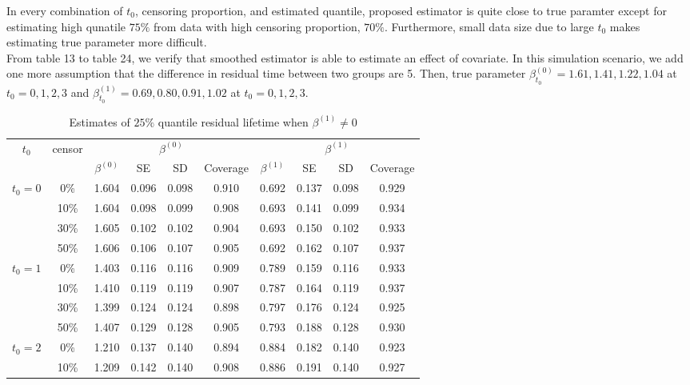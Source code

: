 \documentclass[12pt]{article}
\begin{document}
	In every combination of $t_0$, censoring proportion, and estimated quantile, proposed estimator is quite close to true paramter except for estimating high qunatile $75\%$ from data with high censoring proportion, $70\%$. Furthermore, small data size due to large $t_0$ makes estimating true parameter more difficult.\\
	
	From table 13 to table 24, we verify that smoothed estimator is able to estimate an effect of covariate. In this simulation scenario, we add one more assumption that the difference in residual time between two groups are 5. Then, true parameter $\beta_{t_0}^{(0)} = 1.61, 1.41, 1.22, 1.04$ at $t_0 = 0, 1, 2, 3$ and $\beta_{t_0}^{(1)} = 0.69, 0.80, 0.91, 1.02$ at $t_0 = 0, 1, 2, 3$.

	\begin{table}[H]
		\caption{Estimates of $25\%$ quantile residual lifetime when $\beta^{(1)} \neq 0$}
		\centering
		\begin{tabular}{|c|c|c|c|c|c|c|c|c|c|}
			\hline
			\multirow{2}{*}{$t_0$} & \multirow{2}{*}{censor} & \multicolumn{4}{c|}{$\beta^{(0)}$} & \multicolumn{4}{c|}{$\beta^{(1)}$}\\ \cline{3-10}
			& & $\beta^{(0)}$ & SE & SD  & Coverage  & $\beta^{(1)}$ & SE & SD & Coverage\\
			\hline\hline
			\multirow{4}{*}{$t_0=0$} & 0\% & 1.604 & 0.096 & 0.098 & 0.910 & 0.692 & 0.137 & 0.098 & 0.929 \\
			& 10\% & 1.604 & 0.098 & 0.099 & 0.908 & 0.693 & 0.141 & 0.099 & 0.934 \\
			& 30\% & 1.605 & 0.102 & 0.102 & 0.904 & 0.693 & 0.150 & 0.102 & 0.933 \\
			& 50\% & 1.606 & 0.106 & 0.107 & 0.905 & 0.692 & 0.162 & 0.107 & 0.937 \\
			\hline
			\multirow{4}{*}{$t_0=1$} & 0\% & 1.403 & 0.116 & 0.116 & 0.909 & 0.789 & 0.159 & 0.116 & 0.933 \\
			& 10\% & 1.410 & 0.119 & 0.119 & 0.907 & 0.787 & 0.164 & 0.119 & 0.937 \\
			& 30\% & 1.399 & 0.124 & 0.124 & 0.898 & 0.797 & 0.176 & 0.124 & 0.925 \\
			& 50\% & 1.407 & 0.129 & 0.128 & 0.905 & 0.793 & 0.188 & 0.128 & 0.930 \\
			\hline
			\multirow{4}{*}{$t_0=2$} & 0\% & 1.210 & 0.137 & 0.140 & 0.894 & 0.884 & 0.182 & 0.140 & 0.923 \\
			& 10\% & 1.209 & 0.142 & 0.140 & 0.908 & 0.886 & 0.191 & 0.140 & 0.927 \\

\end{tabular}
\end{table}
\end{document}
